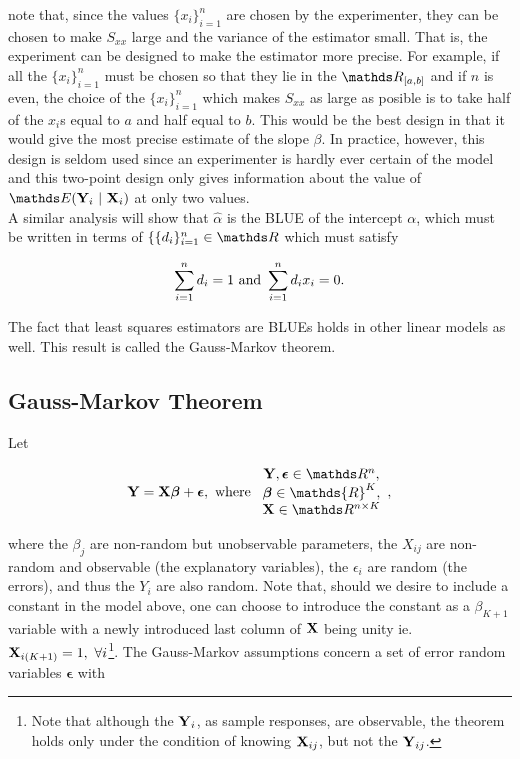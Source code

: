 \documentclass{homework}
\begin{document}
note that, since the values $\{x_i\}_{i=1}^{n}$ are chosen by the experimenter, they can be chosen to make $S_{xx}$ large and the variance of the estimator small. That is, the experiment can be designed to make the estimator more precise. For example, if all the $\{x_i\}_{i=1}^{n}$ must be chosen so that they lie in the $\R_{[a,b]}$ and if $n$ is even, the choice of the $\{x_i\}_{i=1}^{n}$ which makes $S_{xx}$ as large as posible is to take half of the $x_i$s equal to $a$ and half equal to $b$. This would be the best design in that it would give the most precise estimate of the slope $\beta$. In practice, however, this design is seldom used since an experimenter is hardly ever certain of the model and this two-point design only gives information about the value of $\E ({\bf Y}_i\blank|\blank{\bf X}_i)$ at only two values. \\

A similar analysis will show that $\hat{\alpha}$ is the BLUE of the intercept $\alpha$, which must be written in terms of
$\{\{d_i\}_{i=1}^{n} \in \R$ which must satisfy 

\begin{align}
    \sum_{i=1}^{n} d_i = 1 \textnormal{ and } \sum_{i=1}^{n} d_i x_i = 0.
\end{align}

The fact that least squares estimators are BLUEs holds in other linear models as well. This result is called the Gauss-Markov theorem. \\

\subsection{Gauss-Markov Theorem}
Let 

\begin{equation}
    {\bf Y} = {\bf X} \bm{\beta} + \bm{\epsilon}, \textnormal{ where } \begin{array}{c}
         {\bf Y}, \bm{\epsilon} \in \R^{n}, \\
         \bm{\beta} \in \mathds{R}^{K}, \\
         {\bf X} \in \R^{n \times K}
    \end{array},
\end{equation}

where the $\beta_j$ are non-random but unobservable parameters, the $X_{ij}$ are non-random and observable (the explanatory variables), the $\epsilon_i$ are random (the errors), and thus the $Y_i$ are also random. Note that, should we desire to include a constant in the model above, one can choose to introduce the constant as a $\beta_{K+1}$ variable with a newly introduced last column of ${\bf X}$ being unity ie. ${\bf X}_{i(K+1)} = 1, \textnormal{ } \forall i$\footnote{Note that although the ${\bf Y}_i$, as sample responses, are observable, the theorem holds only under the condition of knowing ${\bf X}_{ij}$, but not the ${\bf Y}_{ij}$.}. The Gauss-Markov assumptions concern a set of error random variables ${\bm \epsilon}$ with 
\end{document}
